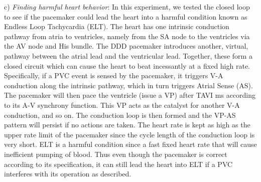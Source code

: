 c) \emph{Finding harmful heart behavior}: In this experiment, we tested the closed loop to see if the pacemaker could lead the heart into a harmful condition known as Endless Loop Tachycardia (ELT).
%
The heart has one intrinsic conduction pathway from atria to ventricles, namely from the SA node to the ventricles via the AV node and His bundle.
The DDD pacemaker introduces another, virtual, pathway between the atrial lead and the ventricular lead.
Together, these form a closed circuit which can cause the heart to beat incessantly at a fixed high rate.
Specifically, if a PVC event is sensed by the pacemaker, it triggers V-A conduction along the intrinsic pathway, 
which in turn triggers Atrial Sense (AS). 
The pacemaker will then pace the ventricle (issue a VP) after TAVI ms according to its A-V synchrony function. 
This VP acts as the catalyst for another V-A conduction, and so on.
The conduction loop is then formed and the VP-AS pattern will persist if no actions are taken.
The heart rate is kept as high as the upper rate limit of the pacemaker since the cycle length of the conduction loop is very short. 
ELT is a harmful condition since a fast fixed heart rate that will cause inefficient pumping of blood.
Thus even though the pacemaker is correct according to its specification, it can still lead the heart into ELT if a PVC interferes with its operation as described.
%

